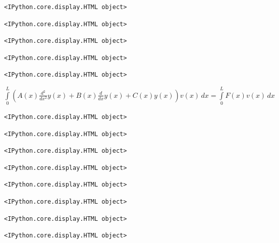 \documentclass[
  11pt,
  a4paper,
]{scrbook}
\begin{document}
\begin{verbatim}
<IPython.core.display.HTML object>
\end{verbatim}

\begin{verbatim}
<IPython.core.display.HTML object>
\end{verbatim}

\begin{verbatim}
<IPython.core.display.HTML object>
\end{verbatim}

\begin{verbatim}
<IPython.core.display.HTML object>
\end{verbatim}

\begin{verbatim}
<IPython.core.display.HTML object>
\end{verbatim}

$\displaystyle \int\limits_{0}^{L} \left(A{\left(x \right)} \frac{d^{2}}{d x^{2}} y{\left(x \right)} + B{\left(x \right)} \frac{d}{d x} y{\left(x \right)} + C{\left(x \right)} y{\left(x \right)}\right) v{\left(x \right)}\, dx = \int\limits_{0}^{L} F{\left(x \right)} v{\left(x \right)}\, dx$

\begin{verbatim}
<IPython.core.display.HTML object>
\end{verbatim}

\begin{verbatim}
<IPython.core.display.HTML object>
\end{verbatim}

\begin{verbatim}
<IPython.core.display.HTML object>
\end{verbatim}

\begin{verbatim}
<IPython.core.display.HTML object>
\end{verbatim}

\begin{verbatim}
<IPython.core.display.HTML object>
\end{verbatim}

\begin{verbatim}
<IPython.core.display.HTML object>
\end{verbatim}

\begin{verbatim}
<IPython.core.display.HTML object>
\end{verbatim}

\begin{verbatim}
<IPython.core.display.HTML object>
\end{verbatim}
\end{document}
